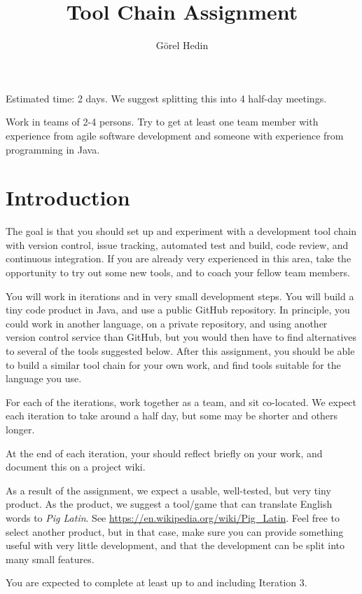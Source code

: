 \documentclass[swedish,english]{article}
\author{G{\"o}rel Hedin}
\title{Tool Chain Assignment}
\begin{document}

Estimated time: 2 days. We suggest splitting this into 4 half-day meetings.

Work in teams of 2-4 persons. Try to get at least one team member with experience from agile software development and someone with experience from programming in Java.

\section*{Introduction}

The goal is that you should set up and experiment with a development tool chain with version control, issue tracking, automated test and build, code review, and continuous integration. If you are already very experienced in this area, take the opportunity to try out some new tools, and to coach your fellow team members.

You will work in iterations and in very small development steps. You will build a tiny code product in Java, and use a public GitHub repository. In principle, you could work in another language, on a private repository, and using another version control service than GitHub, but you would then have to find alternatives to several of the tools suggested below. After this assignment, you should be able to build a similar tool chain for your own work, and find tools suitable for the language you use. 

For each of the iterations, work together as a team, and sit co-located. We expect each iteration to take around a half day, but some may be shorter and others longer.

At the end of each iteration, your should reflect briefly on your work, and document this on a project wiki. 

As a result of the assignment, we expect a usable, well-tested, but very tiny product. As the product, we suggest a tool/game that can translate English words to \emph{Pig Latin}. See \url{https://en.wikipedia.org/wiki/Pig_Latin}. Feel free to select another product, but in that case, make sure you can provide something useful with very little development, and that the development can be split into many small features.

You are expected to complete at least up to and including Iteration 3.
\end{document}

